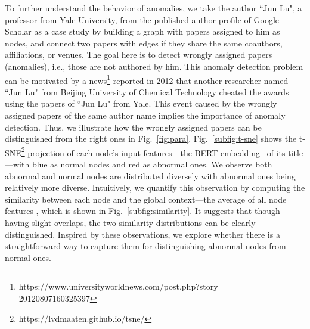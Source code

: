 To further understand the behavior of anomalies, we take the author ``Jun Lu", a professor from Yale University, from the published author profile of Google Scholar as a case study by building a graph with papers assigned to him as nodes, and connect two papers with edges if they share the same coauthors, affiliations, or venues. 
The goal here is to detect wrongly assigned papers (anomalies), i.e., those are not authored by him. 
This anomaly detection problem can be motivated by a news\footnote{https://www.universityworldnews.com/post.php?story=\\20120807160325397} reported in 2012 that another researcher named ``Jun Lu" from Beijing University of Chemical Technology cheated the awards using the papers of ``Jun Lu" from Yale. This event caused by the wrongly assigned papers of the same author name implies the importance of anomaly detection. Thus, we illustrate how the wrongly assigned papers can be distinguished from the right ones in Fig.~\ref{fig:para}.
Fig.~\ref{subfig:t-sne} shows the t-SNE\footnote{https://lvdmaaten.github.io/tsne/} projection of each node's input features---the BERT embedding~\cite{devlin2019bert} of its title---with blue as normal nodes and red as abnormal ones. 
We observe both abnormal and normal nodes are distributed diversely with abnormal ones being relatively more diverse. 
Intuitively, we quantify this observation by computing the similarity between each node and the global context---the average of all node features%
, which is shown in Fig.~\ref{subfig:similarity}. 
It suggests that though having slight overlaps, the two similarity distributions can be clearly distinguished. 
Inspired by these observations, we explore whether there is a straightforward way to capture them for distinguishing abnormal nodes from normal ones. 







